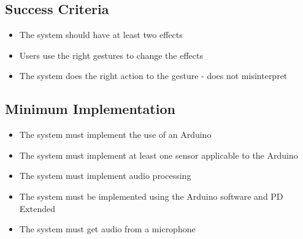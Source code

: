 \subsection{Success Criteria}

\begin{itemize}
	\item The system should have at least two effects
	\item Users use the right gestures to change the effects
	\item The system does the right action to the gesture - does not misinterpret 
\end{itemize}



\subsection{Minimum Implementation}
\begin{itemize}
	\item The system must implement the use of an Arduino
	\item The system must implement at least one sensor applicable to the Arduino
	\item The system must implement audio processing
	\item The system must be implemented using the Arduino software and PD Extended
	\item The system must get audio from a microphone
\end{itemize}

